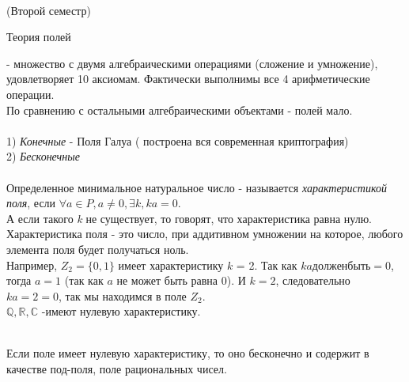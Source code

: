 
\begin{center}
 \\
\LARGE{(Второй семестр)} \\

\end{center}

\begin{title}
	{Теория полей}
\end{title}

 - множество с двумя алгебраическими операциями (сложение и умножение),
удовлетворяет 10 аксиомам. Фактически выполнимы все 4 арифметические операции.\\

По сравнению с остальными алгебраическими объектами - полей мало. \\

\\
1) {\emph {Конечные}} - Поля Галуа ( построена вся современная криптография)\\
2) {\emph {Бесконечные}} \\

\\
Определенное минимальное натуральное число  - называется {\emph
{характеристикой поля}}, если $\forall \mathit{a} \in \mathit {P,a} \neq 0,
\exists \mathit {k}, \mathit{ka} = 0 $. \\
А если такого {\emph {k}} не существует, то говорят, что характеристика равна
нулю.\\
Характеристика поля - это число, при аддитивном умножении на которое,
любого элемента поля будет получаться ноль.\\

Например, $Z_{2} = \{0,1\}$ имеет характеристику $k$ = 2. 
Так как $\mathit{ka} должен быть = 0$, тогда $a = 1$ (так как 
$a$ не может быть равна 0). И $k = 2$, следовательно
$\mathit{ka} = 2 = 0$, так мы находимся в поле $Z_{2}$.\\

$\mathbb{Q, R, C}$ -имеют нулевую характеристику.\\

 \\

\begin{theorem}
	Если поле имеет нулевую характеристику, то оно бесконечно и содержит в
	качестве под-поля, поле рациональных чисел.
\end{theorem}

